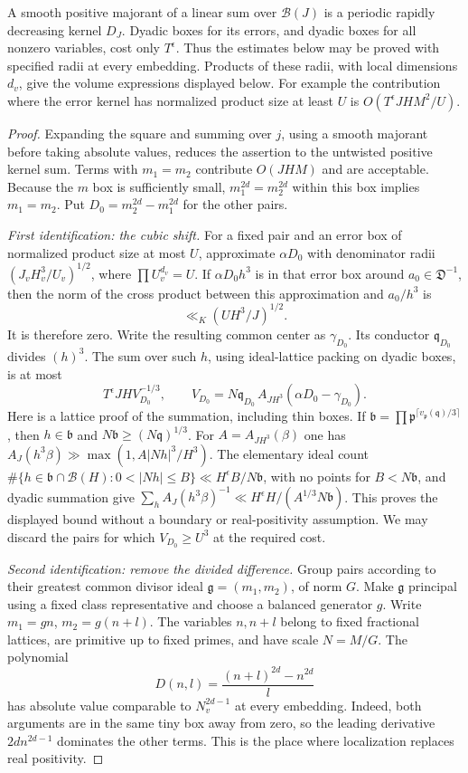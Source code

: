 \documentclass[11pt]{amsart}
\theoremstyle{definition}
\numberwithin{equation}{section}
\begin{document}
A smooth positive majorant of a linear sum over $\mathcal B(J)$ is a
periodic rapidly decreasing kernel $D_J$.  Dyadic boxes for its errors,
and dyadic boxes for all nonzero variables, cost only $T^\epsilon$.
Thus the estimates below may be proved with specified radii at every
embedding.  Products of these radii, with local dimensions $d_v$, give
the volume expressions displayed below.  For example the contribution
where the error kernel has normalized product size at least $U$ is
$O(T^\epsilon JHM^2/U)$.

\begin{proof}
Expanding the square and summing over $j$, using a smooth majorant before
taking absolute values, reduces the assertion to the untwisted positive
kernel sum.  Terms with $m_1=m_2$ contribute $O(JHM)$ and are acceptable.
Because the $m$ box is sufficiently small, $m_1^{2d}=m_2^{2d}$ within this
box implies $m_1=m_2$.  Put $D_0=m_2^{2d}-m_1^{2d}$ for the other pairs.

\emph{First identification: the cubic shift.}
For a fixed pair and an error box of normalized product size at most $U$,
approximate $\alpha D_0$ with denominator radii
$(J_vH_v^3/U_v)^{1/2}$, where $\prod U_v^{d_v}=U$.
If $\alpha D_0h^3$ is in that error box around $a_0\in\mathfrak D^{-1}$,
then the norm of the cross product between this approximation and $a_0/h^3$
is
\[
 \ll_K (UH^3/J)^{1/2}.
\]
It is therefore zero.  Write the resulting common center as $\gamma_{D_0}$.
Its conductor $\mathfrak q_{D_0}$ divides $(h)^3$.
The sum over such $h$, using ideal-lattice packing on dyadic boxes, is at most
\[
 T^\epsilon JH V_{D_0}^{-1/3},\qquad
 V_{D_0}=N\mathfrak q_{D_0}\,
 A_{JH^3}(\alpha D_0-\gamma_{D_0}).
\]
Here is a lattice proof of the summation, including thin boxes.  If
$\mathfrak b=\prod\mathfrak p^{\lceil v_\mathfrak p(\mathfrak q)/3\rceil}$,
then $h\in\mathfrak b$ and $N\mathfrak b\ge(N\mathfrak q)^{1/3}$.
For $A=A_{JH^3}(\beta)$ one has
$A_J(h^3\beta)\gg\max(1,A|Nh|^3/H^3)$.
The elementary ideal count
$\#\{h\in\mathfrak b\cap\mathcal B(H):0<|Nh|\le B\}
\ll H^\epsilon B/N\mathfrak b$, with no points for $B<N\mathfrak b$,
and dyadic summation give
$\sum_h A_J(h^3\beta)^{-1}\ll H^\epsilon H/(A^{1/3}N\mathfrak b)$.
This proves the displayed bound without a boundary or real-positivity assumption.
We may discard the pairs for which $V_{D_0}\ge U^3$ at the required cost.

\emph{Second identification: remove the divided difference.}
Group pairs according to their greatest common divisor ideal
$\mathfrak g=(m_1,m_2)$, of norm $G$.  Make $\mathfrak g$ principal using a
fixed class representative and choose a balanced generator $g$.
Write $m_1=gn$, $m_2=g(n+l)$.  The variables $n,n+l$ belong to fixed fractional
lattices, are primitive up to fixed primes, and have scale $N=M/G$.
The polynomial
\[
 D(n,l)=\frac{(n+l)^{2d}-n^{2d}}{l}
\]
has absolute value comparable to $N_v^{2d-1}$ at every embedding.
Indeed, both arguments are in the same tiny box away from zero, so the
leading derivative $2d n^{2d-1}$ dominates the other terms.
This is the place where localization replaces real positivity.


\end{proof}
\end{document}
